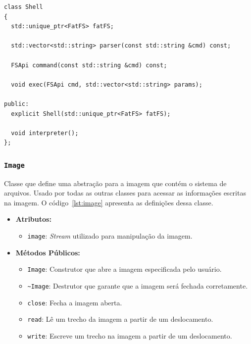 \documentclass[
    12pt,				%
    oneside,   	        %
    a4paper,			%
    english,			%
    french,				%
    spanish,			%
    brazil,				%
    ]{pacotes/abntex2}
\begin{document}
\begin{lstlisting}[caption={Classe que implementa o \textit{shell}}, label={lst:shell}]
class Shell
{
  std::unique_ptr<FatFS> fatFS;

  std::vector<std::string> parser(const std::string &cmd) const;

  FSApi command(const std::string &cmd) const;

  void exec(FSApi cmd, std::vector<std::string> params);

public:
  explicit Shell(std::unique_ptr<FatFS> fatFS);

  void interpreter();
};
\end{lstlisting}

\subsubsection{\texttt{Image}}
\label{subsubsec:image}

Classe que define uma abstração para a imagem que contém o sistema de arquivos. Usado por todas as outras classes para acessar as informações escritas na imagem. O código~\ref{lst:image} apresenta as definições dessa classe.

\begin{itemize}
    \item \textbf{Atributos:}
        \begin{itemize}
            \item \texttt{image}: \textit{Stream} utilizado para manipulação da imagem.
        \end{itemize}
    \item \textbf{Métodos Públicos:}
        \begin{itemize}
            \item \texttt{Image}: Construtor que abre a imagem especificada pelo usuário.
            
            \item \texttt{\textasciitilde Image}: Destrutor que garante que a imagem será fechada corretamente.
            
            \item \texttt{close}: Fecha a imagem aberta.
            
            \item \texttt{read}: Lê um trecho da imagem a partir de um deslocamento.
            
            \item \texttt{write}: Escreve um trecho na imagem a partir de um deslocamento.
        \end{itemize}
\end{itemize}
\end{document}
